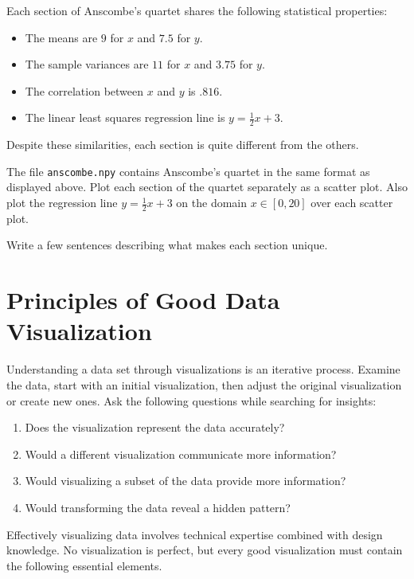Each section of Anscombe's quartet shares the following statistical properties:
\begin{itemize}
\setlength\itemsep{0em}
    \item The means are $9$ for $x$ and $7.5$ for $y$.
    \item The sample variances are $11$ for $x$ and $3.75$ for $y$.
    \item The correlation between $x$ and $y$ is $.816$.
    \item The linear least squares regression line is $y=\frac{1}{2}x+3$.
\end{itemize}

Despite these similarities, each section is quite different from the others.

\begin{problem} %
The file \texttt{anscombe.npy} contains Anscombe's quartet in the same format as displayed above.
Plot each section of the quartet separately as a scatter plot.
Also plot the regression line $y = \frac{1}{2}x + 3$ on the domain $x\in[0,20]$ over each scatter plot.

Write a few sentences describing what makes each section unique.
\label{prob:anscombes-quartet}
\end{problem}

\section*{Principles of Good Data Visualization} %

Understanding a data set through visualizations is an iterative process.
Examine the data, start with an initial visualization, then adjust the original visualization or create new ones.
Ask the following questions while searching for insights:
%
\begin{enumerate}
\item Does the visualization represent the data accurately?
\item Would a different visualization communicate more information?
\item Would visualizing a subset of the data provide more information?
\item Would transforming the data reveal a hidden pattern?
\end{enumerate}

Effectively visualizing data involves technical expertise combined with design knowledge.
No visualization is perfect, but every good visualization must contain the following essential elements.

